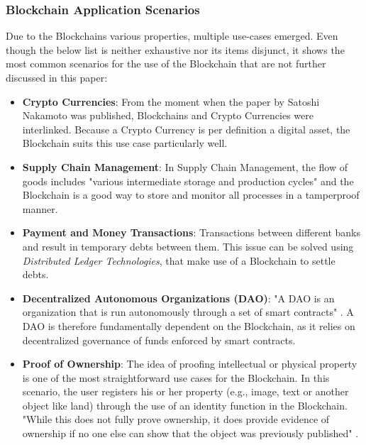 \subsubsection{Blockchain Application Scenarios}
Due to the Blockchains various properties, multiple use-cases emerged. Even though the below list is neither exhaustive nor its items disjunct, it shows the most common scenarios for the use of the Blockchain \cite{Wust2017} that are not further discussed in this paper:
\begin{itemize}
  \item \textbf{Crypto Currencies}: From the moment when the paper by Satoshi Nakamoto \cite{Nakamoto2009} was published, Blockchains and Crypto Currencies were interlinked. Because a Crypto Currency is per definition a digital asset, the Blockchain suits this use case particularly well.
  \item \textbf{Supply Chain Management}: In Supply Chain Management, the flow of goods includes "various intermediate storage and production cycles" \cite{Wust2017} and the Blockchain is a good way to store and monitor all processes in a tamperproof manner.
  \item \textbf{Payment and Money Transactions}: Transactions between different banks and result in temporary debts between them. This issue can be solved using \textit{Distributed Ledger Technologies}, that make use of a Blockchain to settle debts.
  \item \textbf{Decentralized Autonomous Organizations (DAO)}: "A DAO is an organization that is run autonomously through a set of smart contracts" \cite{Wust2017}. A DAO is therefore fundamentally dependent on the Blockchain, as it relies on decentralized governance of funds enforced by smart contracts.
  \item \textbf{Proof of Ownership}: The idea of proofing intellectual or physical property is one of the most straightforward use cases for the Blockchain. In this scenario, the user registers his or her property (e.g., image, text or another object like land) through the use of an identity function in the Blockchain. "While this does not fully prove ownership, it does provide evidence of ownership if no one else can show that the object was previously published" \cite{Wust2017}.
\end{itemize}

